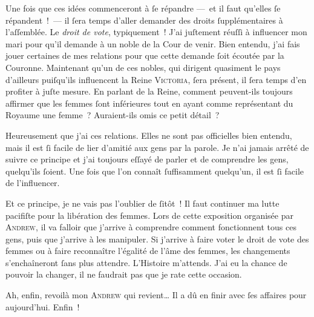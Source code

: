 {Une fois que ces idées commenceront à ſe répandre —~et il faut qu’elles ſe répandent~!~— il ſera temps d’aller demander des droits ſupplémentaires à l’aſſemblée.
Le \emph{droit de vote}, typiquement~!
J’ai juſtement réuſſi à influencer mon mari pour qu’il demande à un noble de la Cour de venir.
Bien entendu, j’ai fais jouer certaines de mes relations pour que cette demande ſoit écoutée par la Couronne.
Maintenant qu’un de ces nobles, qui dirigent quasiment le pays d’ailleurs puiſqu’ils influencent la Reine \textsc{Victoria}, ſera présent, il ſera temps d’en profiter à juſte mesure.
En parlant de la Reine, comment peuvent-ils toujours affirmer que les femmes ſont inférieures tout en ayant comme représentant du Royaume une femme~?
Auraient-ils omis ce petit détail~?

Heureusement que j’ai ces relations.
Elles ne sont pas officielles bien entendu, mais il est ſi facile de lier d’amitié aux gens par la parole.
Je n’ai jamais arrêté de suivre ce principe et j’ai toujours eſſayé de parler et de comprendre les gens, quelqu’ils ſoient.
Une fois que l’on connaît ſuffisamment quelqu’un, il est ſi facile de l’influencer.

Et ce principe, je ne vais pas l’oublier de ſitôt~!
Il faut continuer ma lutte pacifiſte pour la libération des femmes.
Lors de cette exposition organisée par \textsc{Andrew}, il va falloir que j’arrive à comprendre comment fonctionnent tous ces gens, puis que j’arrive à les manipuler.
Si j’arrive à faire voter le droit de vote des femmes ou à faire reconnaître l’égalité de l’âme des femmes, les changements s’enchaîneront ſans plus attendre.
L’Histoire m’attends.
J’ai eu la chance de pouvoir la changer, il ne faudrait pas que je rate cette occasion.

Ah, enfin, revoilà mon \textsc{Andrew} qui revient…
Il a dû en finir avec ſes affaires pour aujourd’hui.
Enfin~!
}

